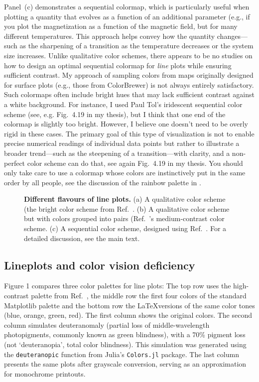 Panel~(c) demonstrates a sequential colormap, which is particularly useful when plotting a quantity that evolves as a function of an additional parameter (e.g., if you plot the magnetization as a function of the magnetic field, but for many different temperatures. This approach helps convey how the quantity changes---such as the sharpening of a transition as the temperature decreases or the system size increases.
Unlike qualitative color schemes, there appears to be no studies on how to design an optimal sequential colormap for \emph{line} plots while ensuring sufficient contrast. My approach of sampling colors from maps originally designed for surface plots (e.g., those from ColorBrewer) is not always entirely satisfactory. Such colormaps often include bright hues that may lack sufficient contrast against a white background. For instance, I used Paul Tol's iridescent sequential color scheme (see, e.g. Fig.~4.19 in my thesis), but I think that one end of the colormap is slightly too bright. However, I believe one doesn't need to be overly rigid in these cases. The primary goal of this type of visualization is not to enable precise numerical readings of individual data points but rather to illustrate a broader trend---such as the steepening of a transition---with clarity, and a non-perfect color scheme can do that, see again Fig.~4.19 in my thesis. You should only take care to use a colormap whose colors are instinctively put in the same order by all people, see the discussion of the rainbow palette in .

\begin{figure}
	\centering
	
	\caption{\textbf{Different flavours of line plots.} (a) A qualitative color scheme (the bright color scheme from Ref.~\cite{paultol}. (b) A qualitative color scheme but with colors grouped into pairs (Ref.~\cite{paultol}'s medium-contrast color scheme. (c) A sequential color scheme, designed using Ref.~\cite{chromajs}. For a detailed discussion, see the main text.}
	\label{fig:lineplotflavour}
\end{figure}


\subsection{Lineplots and color vision deficiency}\label{sub:lineplots_and_color_deficiency}

Figure 1 compares three color palettes for line plots: 
The top row uses the high-contrast palette from Ref.~\cite{paultol}, the middle row the first four colors of the standard Matplotlib palette and the bottom row the \LaTeX versions of the same color tones (blue, orange, green, red). The first column shows the original colors. The second column simulates deuteranomaly (partial loss of middle-wavelength photopigments, commonly known as green blindness), with a 70\% pigment loss (not  `deuteranopia', total color blindness). This simulation was generated using the \verb|deuteranopic| function from Julia’s \verb|Colors.jl| package. The last column presents the same plots after grayscale conversion, serving as an approximation for monochrome printouts.

